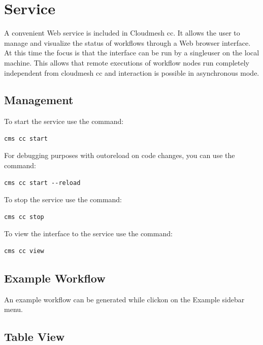 \hypertarget{service}{%
\section{Service}\label{service}}

A convenient Web service is included in Cloudmesh cc. It allows the user
to manage and visualize the status of workflows through a Web browser
interface. At this time the focus is that the interface can be run by a
singleuser on the local machine. This allows that remote executions of
workflow nodes run completely independent from cloudmesh cc and
interaction is possible in asynchronous mode.

\hypertarget{management}{%
\subsection{Management}\label{management}}

To start the service use the command:

\begin{verbatim}
cms cc start
\end{verbatim}

For debugging purposes with outoreload on code changes, you can use the
command:

\begin{verbatim}
cms cc start --reload
\end{verbatim}

To stop the service use the command:

\begin{verbatim}
cms cc stop
\end{verbatim}

To view the interface to the service use the command:

\begin{verbatim}
cms cc view
\end{verbatim}

\hypertarget{example-workflow}{%
\subsection{Example Workflow}\label{example-workflow}}

An example workflow can be generated while clickon on the Example
sidebar menu.

\hypertarget{table-view}{%
\subsection{Table View}\label{table-view}}

